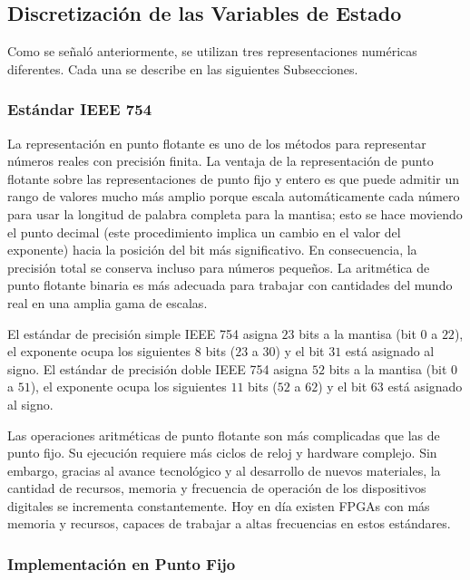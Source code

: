 \subsection{Discretización de las Variables de Estado}
\label{sec:numrepre}

Como se señaló anteriormente, se utilizan tres representaciones numéricas diferentes.
Cada una se describe en las siguientes Subsecciones.

\subsubsection{Estándar IEEE 754}
\label{sec:impleFloat}

La representación en punto flotante es uno de los métodos para representar números reales con precisión finita.
La ventaja de la representación de punto flotante sobre las representaciones de punto fijo y entero es que puede admitir un rango de valores mucho más amplio porque escala automáticamente cada número para usar la longitud de palabra completa para la mantisa; esto se hace moviendo el punto decimal (este procedimiento implica un cambio en el valor del exponente) hacia la posición del bit más significativo.
En consecuencia, la precisión total se conserva incluso para números pequeños.
La aritmética de punto flotante binaria es más adecuada para trabajar con cantidades del mundo real en una amplia gama de escalas.

El estándar de precisión simple IEEE 754 asigna $23$ bits a la mantisa (bit $0$ a $22$), el exponente ocupa los siguientes $8$ bits ($23$ a $30$) y el bit $31$ está asignado al signo.
El estándar de precisión doble IEEE 754 asigna $52$ bits a la mantisa (bit $0$ a $51$), el exponente ocupa los siguientes $11$ bits ($52$ a $62$) y el bit $63$ está asignado al signo.

Las operaciones aritméticas de punto flotante son más complicadas que las de punto fijo.
Su ejecución requiere más ciclos de reloj y hardware complejo.
Sin embargo, gracias al avance tecnológico y al desarrollo de nuevos materiales, la cantidad de recursos, memoria y frecuencia de operación de los dispositivos digitales se incrementa constantemente.
Hoy en día existen FPGAs con más memoria y recursos, capaces de trabajar a altas frecuencias en estos estándares.

\subsubsection{Implementación en Punto Fijo}
\label{sec:impleFix}

